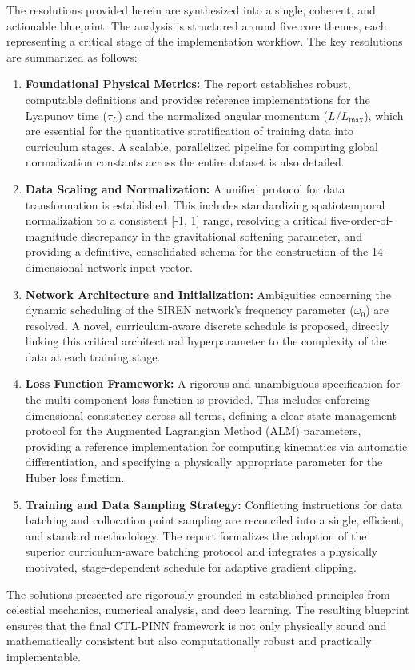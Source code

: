 The resolutions provided herein are synthesized into a single, coherent, and actionable blueprint. The analysis is structured around five core themes, each representing a critical stage of the implementation workflow. The key resolutions are summarized as follows:
\begin{enumerate}
    \item \textbf{Foundational Physical Metrics:} The report establishes robust, computable definitions and provides reference implementations for the Lyapunov time ($\tau_L$) and the normalized angular momentum ($L/L_{\max}$), which are essential for the quantitative stratification of training data into curriculum stages. A scalable, parallelized pipeline for computing global normalization constants across the entire dataset is also detailed.
    \item \textbf{Data Scaling and Normalization:} A unified protocol for data transformation is established. This includes standardizing spatiotemporal normalization to a consistent [-1, 1] range, resolving a critical five-order-of-magnitude discrepancy in the gravitational softening parameter, and providing a definitive, consolidated schema for the construction of the 14-dimensional network input vector.
    \item \textbf{Network Architecture and Initialization:} Ambiguities con\-cerning the dynamic scheduling of the SIREN network's frequency parameter ($\omega_0$) are resolved. A novel, curriculum-aware discrete schedule is proposed, directly linking this critical architectural hyperparameter to the complexity of the data at each training stage.
    \item \textbf{Loss Function Framework:} A rigorous and unambiguous specification for the multi-component loss function is provided. This includes enforcing dimensional consistency across all terms, defining a clear state management protocol for the Augmented Lagrangian Method (ALM) parameters, providing a reference implementation for computing kinematics via automatic differentiation, and specifying a physically appropriate parameter for the Huber loss function.
    \item \textbf{Training and Data Sampling Strategy:} Conflicting instructions for data batching and collocation point sampling are reconciled into a single, efficient, and standard methodology. The report formalizes the adoption of the superior curriculum-aware batching protocol and integrates a physically motivated, stage-dependent schedule for adaptive gradient clipping.
\end{enumerate}
The solutions presented are rigorously grounded in established principles from celestial mechanics, numerical analysis, and deep learning. The resulting blueprint ensures that the final CTL-PINN framework is not only physically sound and mathematically consistent but also computationally robust and practically implementable.

\clearpage

